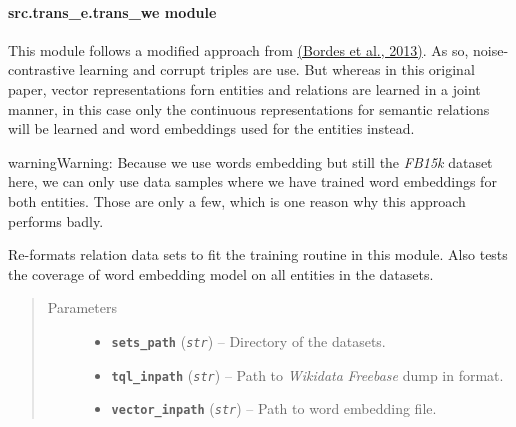 \documentclass[letterpaper,10pt,english]{sphinxmanual}
\begin{document}
\paragraph{src.trans\_e.trans\_we module}
\label{src.trans_e:src-trans-e-trans-we-module}\label{src.trans_e:module-src.trans_e.trans_we}
This module follows a modified approach from
\href{http://papers.nips.cc/paper/5071-translating-embeddings-for-modeling-multi-relational-data.pdf}{(Bordes et al., 2013)}.
As so, noise-contrastive learning and corrupt triples are use. But whereas in this original paper,
vector representations forn entities and relations are learned in a joint manner, in this case only the continuous
representations for semantic relations will be learned and word embeddings used for the entities instead.

\begin{notice}{warning}{Warning:}
Because we use words embedding but still the \emph{FB15k} dataset here, we can only use data samples where we have
trained word embeddings for both entities. Those are only a few, which is one reason why this approach performs
badly.
\end{notice}

\begin{fulllineitems}
\label{src.trans_e:src.trans_e.trans_we.convert_data}
Re-formats relation data sets to fit the training routine in this module.
Also tests the coverage of word embedding model on all entities in the datasets.
\begin{quote}\begin{description}
\item[{Parameters}] \leavevmode\begin{itemize}
\item {} 
\textbf{\texttt{sets\_path}} (\emph{\texttt{str}}) -- Directory of the datasets.

\item {} 
\textbf{\texttt{tql\_inpath}} (\emph{\texttt{str}}) -- Path to \emph{Wikidata} \emph{Freebase} dump in  format.

\item {} 
\textbf{\texttt{vector\_inpath}} (\emph{\texttt{str}}) -- Path to word embedding file.

\end{itemize}

\end{description}\end{quote}

\end{fulllineitems}
\end{document}
